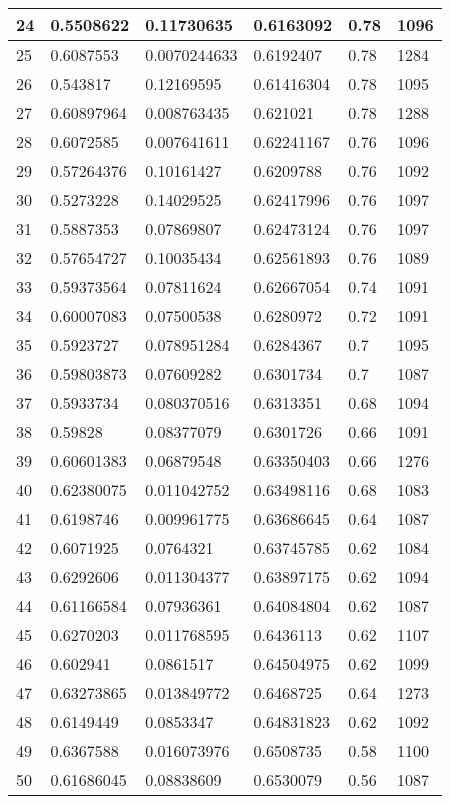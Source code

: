 \begin{longtable}{|l|l|l|l|l|l|}
24 & 0.5508622 & 0.11730635 & 0.6163092 & 0.78 & 1096 \\ \hline 
25 & 0.6087553 & 0.0070244633 & 0.6192407 & 0.78 & 1284 \\ \hline 
26 & 0.543817 & 0.12169595 & 0.61416304 & 0.78 & 1095 \\ \hline 
27 & 0.60897964 & 0.008763435 & 0.621021 & 0.78 & 1288 \\ \hline 
28 & 0.6072585 & 0.007641611 & 0.62241167 & 0.76 & 1096 \\ \hline 
29 & 0.57264376 & 0.10161427 & 0.6209788 & 0.76 & 1092 \\ \hline 
30 & 0.5273228 & 0.14029525 & 0.62417996 & 0.76 & 1097 \\ \hline 
31 & 0.5887353 & 0.07869807 & 0.62473124 & 0.76 & 1097 \\ \hline 
32 & 0.57654727 & 0.10035434 & 0.62561893 & 0.76 & 1089 \\ \hline 
33 & 0.59373564 & 0.07811624 & 0.62667054 & 0.74 & 1091 \\ \hline 
34 & 0.60007083 & 0.07500538 & 0.6280972 & 0.72 & 1091 \\ \hline 
35 & 0.5923727 & 0.078951284 & 0.6284367 & 0.7 & 1095 \\ \hline 
36 & 0.59803873 & 0.07609282 & 0.6301734 & 0.7 & 1087 \\ \hline 
37 & 0.5933734 & 0.080370516 & 0.6313351 & 0.68 & 1094 \\ \hline 
38 & 0.59828 & 0.08377079 & 0.6301726 & 0.66 & 1091 \\ \hline 
39 & 0.60601383 & 0.06879548 & 0.63350403 & 0.66 & 1276 \\ \hline 
40 & 0.62380075 & 0.011042752 & 0.63498116 & 0.68 & 1083 \\ \hline 
41 & 0.6198746 & 0.009961775 & 0.63686645 & 0.64 & 1087 \\ \hline 
42 & 0.6071925 & 0.0764321 & 0.63745785 & 0.62 & 1084 \\ \hline 
43 & 0.6292606 & 0.011304377 & 0.63897175 & 0.62 & 1094 \\ \hline 
44 & 0.61166584 & 0.07936361 & 0.64084804 & 0.62 & 1087 \\ \hline 
45 & 0.6270203 & 0.011768595 & 0.6436113 & 0.62 & 1107 \\ \hline 
46 & 0.602941 & 0.0861517 & 0.64504975 & 0.62 & 1099 \\ \hline 
47 & 0.63273865 & 0.013849772 & 0.6468725 & 0.64 & 1273 \\ \hline 
48 & 0.6149449 & 0.0853347 & 0.64831823 & 0.62 & 1092 \\ \hline 
49 & 0.6367588 & 0.016073976 & 0.6508735 & 0.58 & 1100 \\ \hline 
50 & 0.61686045 & 0.08838609 & 0.6530079 & 0.56 & 1087 \\ \hline 
\end{longtable}